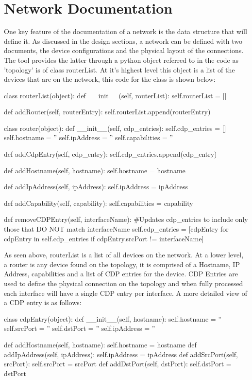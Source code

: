 \documentclass[11pt]{report}
\begin{document}
\section{Network Documentation}

One key feature of the documentation of a network is the data structure that will define it. As discussed in the design sections, a network can be defined with two documents, the device configurations and the physical layout of the connections. The tool provides the latter through a python object referred to in the code as 'topology' is of class routerList. At it's highest level this object is a list of the devices that are on the network, this code for the class is shown below:

\begin{python}
	class routerList(object):
		def __init__(self, routerList):
			self.routerList = []
	
		def addRouter(self, routerEntry):
			self.routerList.append(routerEntry)
	
	class router(object):
		def __init__(self, cdp_entries):
			self.cdp_entries = []
			self.hostname = ''
			self.ipAddress = ''
			self.capabilities = ''
	
		def addCdpEntry(self, cdp_entry):
			self.cdp_entries.append(cdp_entry)
	
		def addHostname(self, hostname):
			self.hostname = hostname
	
		def addIpAddress(self, ipAddress):
			self.ipAddress = ipAddress
	
		def addCapability(self, capability):
			self.capabilities = capability
	
		def removeCDPEntry(self, interfaceName):
			#Updates cdp_entries to include only those that DO NOT match interfaceName
			self.cdp_entries = [cdpEntry for cdpEntry in self.cdp_entries if cdpEntry.srcPort != interfaceName]
\end{python}

As seen above, routerList is a list of all devices on the network. At a lower level, a router is any device found on the topology, it is comprised of a Hostname, IP Address, capabilities and a list of CDP entries for the device. CDP Entries are used to define the physical connection on the topology and when fully processed each interface will have a single CDP entry per interface. A more detailed view of a CDP entry is as follows:

\begin{python}
		class cdpEntry(object):
			def __init__(self, hostname):
				self.hostname = ''
				self.srcPort = ''
				self.dstPort = ''
				self.ipAddress = ''
		
			def addHostname(self, hostname):
				self.hostname = hostname
			def addIpAddress(self, ipAddress):
				self.ipAddress = ipAddress
			def addSrcPort(self, srcPort):
				self.srcPort = srcPort
			def addDstPort(self, dstPort):
				self.dstPort = dstPort
\end{python}
\end{document}
